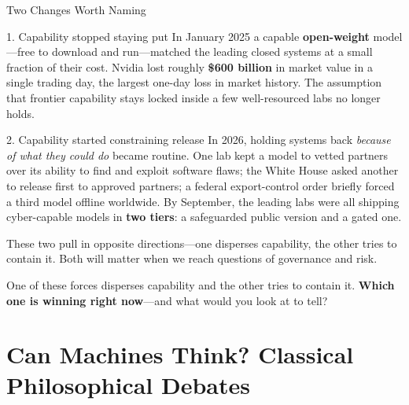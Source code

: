 ﻿\documentclass[aspectratio=169,11pt]{beamer}
\begin{document}
\begin{frame}[shrink=8]{Two Changes Worth Naming}
\begin{block}{1. Capability stopped staying put}
In January 2025 a capable \textbf{open-weight} model---free to download and run---matched the leading closed systems at a small fraction of their cost. Nvidia lost roughly \textbf{\$600 billion} in market value in a single trading day, the largest one-day loss in market history. The assumption that frontier capability stays locked inside a few well-resourced labs no longer holds.
\end{block}

\vspace{0.2em}
\begin{alertblock}{2. Capability started constraining release}
In 2026, holding systems back \emph{because of what they could do} became routine. One lab kept a model to vetted partners over its ability to find and exploit software flaws; the White House asked another to release first to approved partners; a federal export-control order briefly forced a third model offline worldwide. By September, the leading labs were all shipping cyber-capable models in \textbf{two tiers}: a safeguarded public version and a gated one.
\end{alertblock}

\vspace{0.2em}
These two pull in opposite directions---one disperses capability, the other tries to contain it. Both will matter when we reach questions of governance and risk.

\begin{discussionbox}[Discussion]
One of these forces disperses capability and the other tries to contain it. \textbf{Which one is winning right now}---and what would you look at to tell?
\end{discussionbox}
\end{frame}

\section{Can Machines Think? Classical Philosophical Debates}
\end{document}
